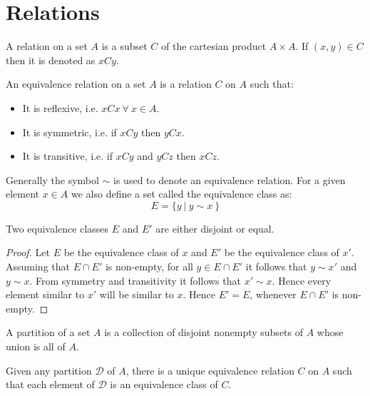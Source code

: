 \section{Relations}
\begin{definition}
  A relation on a set $A$ is a subset $C$ of the cartesian product $A\times A$. If $(x,y)\in C$ then it is denoted as $xCy$.
\end{definition}
\begin{definition}
  An equivalence relation on a set $A$ is a relation $C$ on $A$ such that:
  \begin{itemize}
    \item It is reflexive, i.e. $xCx\ \forall\ x\in A$.
    \item It is symmetric, i.e. if $xCy$ then $yCx$.
    \item It is transitive, i.e. if $xCy$ and $yCz$ then $xCz$.
  \end{itemize}
\end{definition}
Generally the symbol $\sim$ is used to denote an equivalence relation. For a given element $x\in A$ we also define a set called the equivalence class as:
\[E = \{y\ |\ y\sim x\ \}\]
\begin{proposition}
  Two equivalence classes $E$ and $E'$ are either disjoint or equal.
\end{proposition}
\begin{proof}
  Let $E$ be the equivalence class of $x$ and $E'$ be the equivalence class of $x'$. Assuming that $E\cap E'$ is non-empty, for all $y\in E\cap E'$ it follows that $y\sim x'$ and $y\sim x$. From symmetry and transitivity it follows that $x'\sim x$. Hence every element similar to $x'$ will be similar to $x$. Hence $E'=E$, whenever $E\cap E'$ is non-empty.
\end{proof}
\begin{definition}
  A partition of a set $A$ is a collection of disjoint nonempty subsets of $A$ whose union is all of $A$.
\end{definition}
\begin{proposition}
  Given any partition $\mathscr{D}$ of $A$, there is a unique equivalence relation $C$ on $A$ such that each element of $\mathscr{D}$ is an equivalence class of $C$.
\end{proposition}
